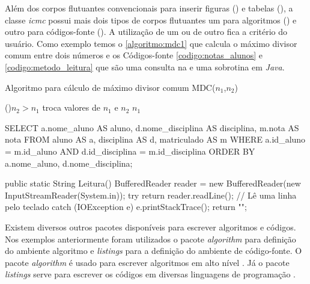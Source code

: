 Além dos corpos flutuantes convencionais para inserir figuras () e tabelas (), a classe \textit{icmc} possui mais dois tipos de corpos flutuantes um para algoritmos () e outro para códigos-fonte (). A utilização de um ou de outro fica a critério do usuário. Como exemplo temos o \autoref{algoritmo:mdc1} que calcula o máximo divisor comum entre dois números e os Códigos-fonte \ref{codigo:notas_alunos} e \ref{codigo:metodo_leitura} que são uma consulta na  e uma sobrotina em \textit{Java}.

\begin{algoritmo}
\caption{Algoritmo para cálculo de máximo divisor comum MDC($n_1$,$n_2$)}
\label{algoritmo:mdc1}

 \If(){$n_2 > n_1$}
   {troca valores de $n_1$ e $n_2$}
 \Return $n_1$
\end{algoritmo}

\begin{codigo}[caption = {Consulta SQL}, label={codigo:notas_alunos},language=SQL, breaklines=true]
SELECT a.nome_aluno AS aluno,
       d.nome_disciplina AS disciplina,
       m.nota AS nota
FROM aluno AS a,
     disciplina AS d,
     matriculado AS m
WHERE a.id_aluno = m.id_aluno
  AND d.id_disciplina = m.id_disciplina
ORDER BY a.nome_aluno, d.nome_disciplina;
\end{codigo}

\begin{codigo}[caption={Subrotina para obter uma entrada do usuário}, label={codigo:metodo_leitura}, language=Java, breaklines=true]
public static String Leitura(){
    BufferedReader reader = new BufferedReader(new InputStreamReader(System.in));
    try {
        return reader.readLine(); // Lê uma linha pelo teclado
    } catch (IOException e) {
        e.printStackTrace();
        return "";
    }
}
\end{codigo}

Existem diversos outros pacotes disponíveis para escrever algoritmos e códigos. Nos exemplos anteriormente foram utilizados o pacote \textit{algorithm} para definição do ambiente algoritmo e \textit{listings} para a definição do ambiente de código-fonte. O pacote \textit{algorithm} é usado para escrever algoritmos em alto nível \cite{janos:2005:algpseudocode}. Já o pacote \textit{listings} serve para escrever os códigos em diversas linguagens de programação \cite{moses:2006:listings}.

